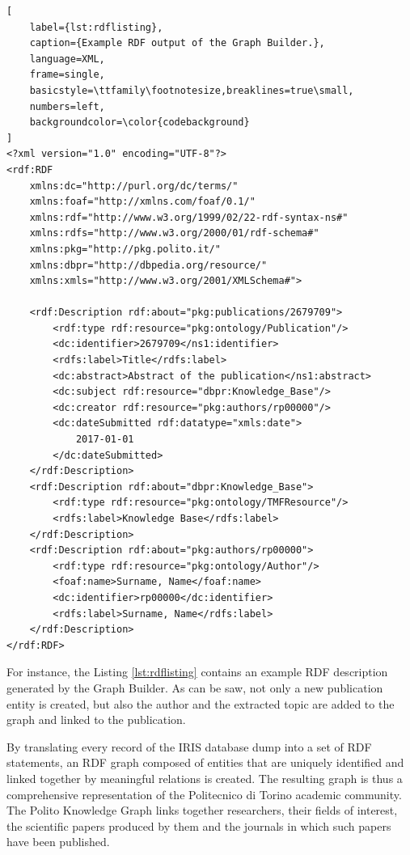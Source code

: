 \documentclass[%
    corpo=13.5pt,
    twoside,
    oldstyle,
    tipotesi=magistrale,
    greek,
    evenboxes
]{toptesi}
\begin{document}
\begin{lstlisting}[
    label={lst:rdflisting},
    caption={Example RDF output of the Graph Builder.},
    language=XML,
    frame=single,
    basicstyle=\ttfamily\footnotesize,breaklines=true\small,
    numbers=left,
    backgroundcolor=\color{codebackground}
]
<?xml version="1.0" encoding="UTF-8"?>
<rdf:RDF
    xmlns:dc="http://purl.org/dc/terms/"
    xmlns:foaf="http://xmlns.com/foaf/0.1/"
    xmlns:rdf="http://www.w3.org/1999/02/22-rdf-syntax-ns#"
    xmlns:rdfs="http://www.w3.org/2000/01/rdf-schema#"
    xmlns:pkg="http://pkg.polito.it/"
    xmlns:dbpr="http://dbpedia.org/resource/"
    xmlns:xmls="http://www.w3.org/2001/XMLSchema#">

    <rdf:Description rdf:about="pkg:publications/2679709">
        <rdf:type rdf:resource="pkg:ontology/Publication"/>
        <dc:identifier>2679709</ns1:identifier>
        <rdfs:label>Title</rdfs:label>
        <dc:abstract>Abstract of the publication</ns1:abstract>
        <dc:subject rdf:resource="dbpr:Knowledge_Base"/>
        <dc:creator rdf:resource="pkg:authors/rp00000"/>
        <dc:dateSubmitted rdf:datatype="xmls:date">
            2017-01-01
        </dc:dateSubmitted>
    </rdf:Description>
    <rdf:Description rdf:about="dbpr:Knowledge_Base">
        <rdf:type rdf:resource="pkg:ontology/TMFResource"/>
        <rdfs:label>Knowledge Base</rdfs:label>
    </rdf:Description>
    <rdf:Description rdf:about="pkg:authors/rp00000">
        <rdf:type rdf:resource="pkg:ontology/Author"/>
        <foaf:name>Surname, Name</foaf:name>
        <dc:identifier>rp00000</dc:identifier>
        <rdfs:label>Surname, Name</rdfs:label>
    </rdf:Description>
</rdf:RDF>
\end{lstlisting}


For instance, the Listing \ref{lst:rdflisting} contains an example RDF description
generated by the Graph Builder. As can be saw, not only a new
publication entity is created, but also the author and the extracted topic are
added to the graph and linked to the publication.

By translating every record of the IRIS database dump into a set of
RDF statements, an RDF graph composed of entities that are uniquely
identified and linked together by meaningful relations is created.
The resulting graph is thus a comprehensive representation of the Politecnico di
Torino academic community.
The Polito Knowledge Graph links together researchers, their fields of
interest, the scientific papers produced by them and the journals in which
such papers have been published.
\end{document}
